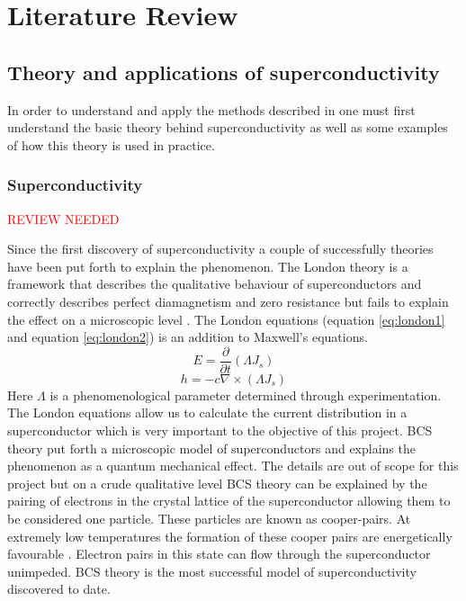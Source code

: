 \graphicspath{{litreview/fig/}}

\chapter{Literature Review}
\label{chap:litreview}


\section{Theory and applications of superconductivity}
In order to understand and apply the methods described in \cite{fluxNoiseSquidsStevenAnton} one must first understand the basic theory behind superconductivity as well as some examples of how this theory is used in practice.

\subsection{Superconductivity}
\textcolor{red}{REVIEW NEEDED}

Since the first discovery of superconductivity a couple of successfully theories have been put forth to explain the phenomenon. The London theory is a framework that describes the qualitative behaviour of superconductors and correctly describes perfect diamagnetism and zero resistance but fails to explain the effect on a microscopic level \cite{Golubov_1998}. The London equations (equation \ref{eq:london1} and equation \ref{eq:london2}) \cite{Tinkham_2015} is an addition to Maxwell's equations.
\begin{equation}
    E = \frac{\partial}{\partial t}(\Lambda J_s)
    \label{eq:london1}
\end{equation}
\begin{equation}
    h = -c \nabla\times (\Lambda J_s)
    \label{eq:london2}
\end{equation}
Here $\Lambda$ is a phenomenological parameter determined through experimentation. The London equations allow us to calculate the current distribution in a superconductor which is very important to the objective of this project. BCS theory put forth a microscopic model of superconductors and explains the phenomenon as a quantum mechanical effect. The details are out of scope for this project but on a crude qualitative level BCS theory can be explained by the pairing of electrons in the crystal lattice of the superconductor allowing them to be considered one particle. These particles are known as cooper-pairs. At extremely low temperatures the formation of these cooper pairs are energetically favourable \cite{Feynman_Leighton_Sands_2013}. Electron pairs in this state can flow through the superconductor unimpeded. BCS theory is the most successful model of superconductivity discovered to date. 

